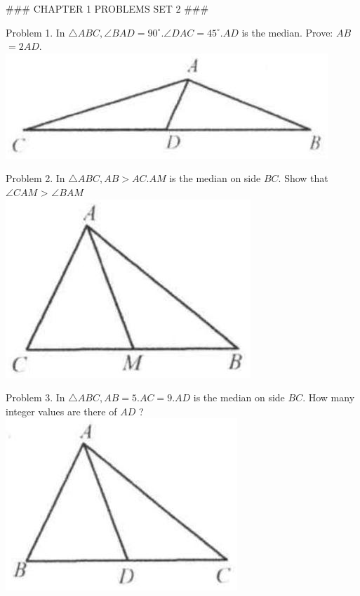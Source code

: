 \documentclass[10pt]{article}
\begin{document}
### CHAPTER 1 PROBLEMS SET 2 ###

Problem 1. In \(\triangle A B C, \angle B A D=90^{\circ} . \angle D A C=45^{\circ} . A D\) is the median. Prove: \(A B\) \(=2 A D\).\\
\includegraphics[max width=\textwidth, center]{2025_04_17_97bc1f7e44d93c271a88g-027(3)}

Problem 2. In \(\triangle A B C, A B>A C . A M\) is the median on side \(B C\). Show that \(\angle C A M\) > \(\angle B A M\)\\
\includegraphics[max width=\textwidth, center]{2025_04_17_97bc1f7e44d93c271a88g-027}

Problem 3. In \(\triangle A B C, A B=5 . A C=9 . A D\) is the median on side \(B C\). How many integer values are there of \(A D\) ?\\
\includegraphics[max width=\textwidth, center]{2025_04_17_97bc1f7e44d93c271a88g-027(2)}
\end{document}
